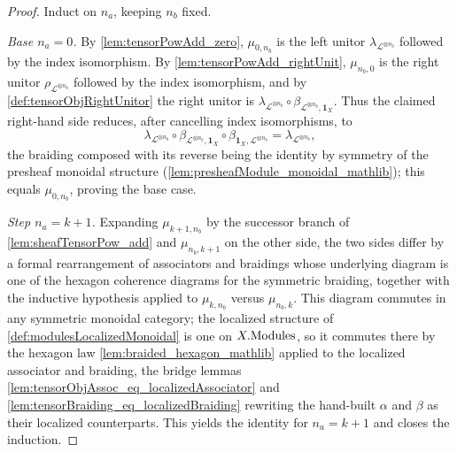 \begin{proof}
  Induct on \(n_a\), keeping \(n_b\) fixed.

  \emph{Base \(n_a = 0\).} By \cref{lem:tensorPowAdd_zero}, \(\mu_{0,n_b}\) is the
  left unitor \(\lambda_{\mathcal{L}^{\otimes n_b}}\) followed by the index
  isomorphism. By \cref{lem:tensorPowAdd_rightUnit}, \(\mu_{n_b,0}\) is the right
  unitor \(\rho_{\mathcal{L}^{\otimes n_b}}\) followed by the index isomorphism, and
  by \cref{def:tensorObjRightUnitor} the right unitor is
  \(\lambda_{\mathcal{L}^{\otimes n_b}} \circ
  \beta_{\mathcal{L}^{\otimes n_b},\mathbf{1}_X}\). Thus the claimed right-hand
  side reduces, after cancelling index isomorphisms, to
  \[
    \lambda_{\mathcal{L}^{\otimes n_b}}
      \circ \beta_{\mathcal{L}^{\otimes n_b},\mathbf{1}_X}
      \circ \beta_{\mathbf{1}_X,\mathcal{L}^{\otimes n_b}}
      = \lambda_{\mathcal{L}^{\otimes n_b}},
  \]
  the braiding composed with its reverse being the identity by symmetry of the
  presheaf monoidal structure (\cref{lem:presheafModule_monoidal_mathlib}); this
  equals \(\mu_{0,n_b}\), proving the base case.

  \emph{Step \(n_a = k+1\).} Expanding \(\mu_{k+1,n_b}\) by the successor branch of
  \cref{lem:sheafTensorPow_add} and \(\mu_{n_b,k+1}\) on the other side, the two
  sides differ by a formal rearrangement of associators and braidings whose
  underlying diagram is one of the hexagon coherence diagrams for the symmetric
  braiding, together with the inductive hypothesis applied to \(\mu_{k,n_b}\)
  versus \(\mu_{n_b,k}\). This diagram commutes in any symmetric monoidal
  category; the localized structure of \cref{def:modulesLocalizedMonoidal} is one
  on \(X.\mathrm{Modules}\), so it commutes there by the hexagon law
  \cref{lem:braided_hexagon_mathlib} applied to the localized associator and
  braiding, the bridge lemmas
  \cref{lem:tensorObjAssoc_eq_localizedAssociator} and
  \cref{lem:tensorBraiding_eq_localizedBraiding} rewriting the hand-built
  \(\alpha\) and \(\beta\) as their localized counterparts. This yields the
  identity for \(n_a = k+1\) and closes the induction.
\end{proof}

